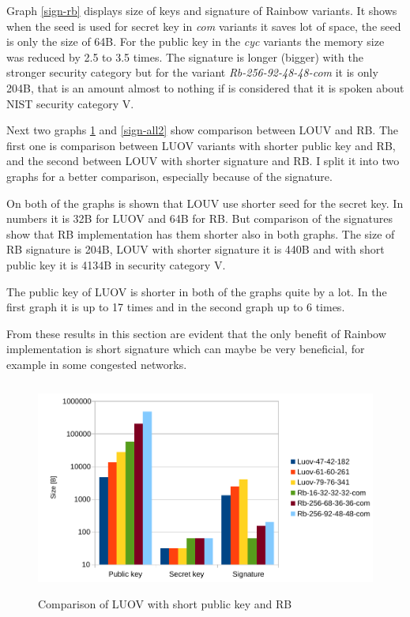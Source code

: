 \documentclass[thesis=M,english]{FITthesis}[2019/12/23]
\begin{document}
\noindent
Graph \ref{sign-rb} displays size of keys and signature of Rainbow variants. It shows when the seed is used for secret key in \textit{com} variants it saves lot of space, the seed is only the size of 64B. For the public key in the \textit{cyc} variants the memory size was reduced by 2.5 to 3.5 times. The signature is longer (bigger) with the stronger security category but for the variant \textit{Rb-256-92-48-48-com} it is only 204B, that is an amount almost to nothing if is considered that it is spoken about NIST security category V.

\bigskip
\noindent
Next two graphs \ref{sign-all1} and \ref{sign-all2} show comparison between LOUV and RB. The first one is comparison between LUOV variants with shorter public key and RB, and the second between LOUV with shorter signature and RB. I split it into two graphs for a better comparison, especially because of the signature.

\bigskip
\noindent
On both of the graphs is shown that LOUV use shorter seed for the secret key. In numbers it is 32B for LUOV and 64B for RB. But comparison of the signatures show that RB implementation has them shorter also in both graphs. The size of RB signature is 204B, LOUV with shorter signature it is 440B and with short public key it is 4134B in security category V.

\bigskip
\noindent
The public key of LUOV is shorter in both of the graphs quite by a lot. In the first graph it is up to 17 times and in the second graph up to 6 times.

\bigskip
\noindent
From these results in this section are evident that the only benefit of Rainbow implementation is short signature which can maybe be very beneficial, for example in some congested networks.

\begin{figure}[H]
\centering
\includegraphics[width=13cm,height=7cm]{images/mem-sign-all1.pdf}
\caption{Comparison of LUOV with short public key and RB}
\label{sign-all1}
\end{figure}
\end{document}
